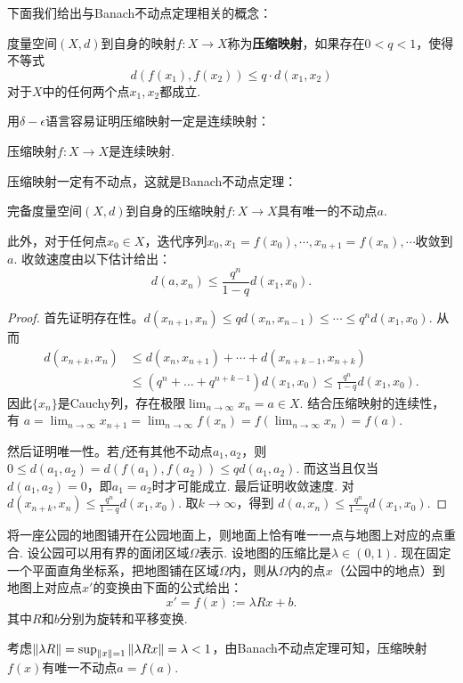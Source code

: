 下面我们给出与Banach不动点定理相关的概念：

\begin{definition}[压缩映射]
度量空间$(X,d)$到自身的映射$f:X\to X$称为\textbf{压缩映射}，如果存在$0<q<1$，使得不等式
    \[d(f(x_1),f(x_2))\le q\cdot d(x_1,x_2)\]
对于$X$中的任何两个点$x_1,x_2$都成立.
\end{definition}

用$\delta-\epsilon$语言容易证明压缩映射一定是连续映射：
\begin{lemma}\label{lemma:contraction-continuous}
    压缩映射$f:X\to X$是连续映射.
\end{lemma}

压缩映射一定有不动点，这就是Banach不动点定理：
\begin{theorem}\label{thm:banach-fixed-point}

完备度量空间$(X,d)$到自身的压缩映射$f:X\to X$具有唯一的不动点$a$. 

此外，对于任何点$x_0\in X$，迭代序列$x_0,x_1=f(x_0),\cdots,x_{n+1}=f(x_n),\cdots$收敛到$a$. 收敛速度由以下估计给出：
\[d(a,x_n)\le \frac{q^n}{1-q}d(x_1,x_0).\]
\end{theorem}

\begin{proof}
首先证明存在性。$d(x_{n+1},x_n)\le qd(x_n,x_{n-1})\le \cdots\le q^nd(x_1,x_0).$
从而
\begin{align*}
d(x_{n+k},x_n)&\le d(x_n,x_{n+1})+\cdots+d(x_{n+k-1},x_{n+k})\\
&\leq(q^n+\dots+q^{n+k-1})d(x_1,x_0)\le \frac{q^{n}}{1-q}d(x_1,x_0).
\end{align*}
因此$\{x_n\}$是Cauchy列，存在极限$\lim_{n\to\infty} x_n=a\in X$.
结合压缩映射的连续性，有
$a=\lim_{n\to\infty}x_{n+1} = \lim_{n\to\infty}f(x_n)=f(\lim_{n\to\infty}x_n)=f(a).$

然后证明唯一性。若$f$还有其他不动点$a_1,a_2$，则
$0\le d(a_1,a_2)=d(f(a_1),f(a_2))\le qd(a_1,a_2).$
而这当且仅当$d(a_1,a_2)=0$，即$a_1=a_2$时才可能成立.
最后证明收敛速度. 对
$d(x_{n+k},x_n)\le \frac{q^n}{1-q}d(x_1,x_0).$
取$k\to\infty$，得到
$d(a,x_n)\le \frac{q^n}{1-q}d(x_1,x_0).$
\end{proof}

\begin{example}[落在地面上的地图]
将一座公园的地图铺开在公园地面上，则地面上恰有唯一一点与地图上对应的点重合. 设公园可以用有界的面闭区域$\Omega$表示. 设地图的压缩比是$\lambda\in(0,1)$. 现在固定一个平面直角坐标系，把地图铺在区域$\Omega$内，则从$\Omega$内的点$x$（公园中的地点）到地图上对应点$x'$的变换由下面的公式给出：
\[x' = f(x) := \lambda Rx + b.\]
其中$R$和$b$分别为旋转和平移变换. 

考虑$\left\|\lambda R\right\|=\sup_{\left\|x\right\|=1}\left\|\lambda Rx\right\|=\lambda<1$，由Banach不动点定理可知，压缩映射$f(x)$有唯一不动点$a=f(a)$.
\end{example}

